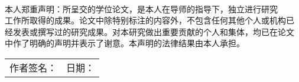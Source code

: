 
\thispagestyle{empty}

 \vspace{14pt}
\begin{center}
	{}\\
	 \vspace{14pt}
	{}
\end{center}

\vspace{14pt}

\begin{spacing}{2.0}
本人郑重声明：所呈交的学位论文，是本人在导师的指导下，独立进行研究\\
工作所取得的成果。论文中除特别标注的内容外，不包含任何其他个人或机构已\\
经发表或撰写过的研究成果。对本研究做出重要贡献的个人和集体，均已在论文\\
中作了明确的声明并表示了谢意。本声明的法律结果由本人承担。
\end{spacing}

 {\hfill{
 \begin{tabular}{ll}\\
 作者签名：\underline{\hspace{2.8cm}}& 日期：\underline{\hspace{2cm}}
 \end{tabular}}\par}

 \vspace{84pt}

\begin{center}
	{}\\
	 \vspace{14pt}
	{}
\end{center}

